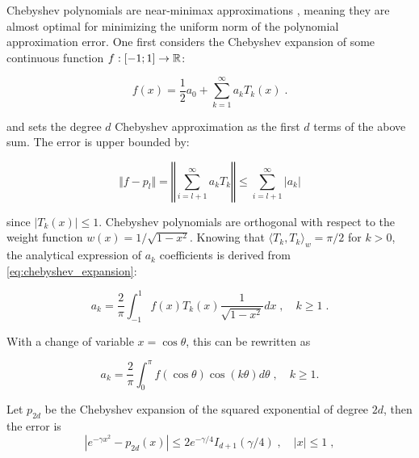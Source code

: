 \documentclass{article}
\begin{document}
{Chebyshev polynomials are near-minimax approximations \cite{elliott_error_1987}, meaning they are almost optimal for minimizing the uniform norm of the polynomial approximation error. 
One first considers the Chebyshev expansion of some continuous function $f: [-1; 1] \to \mathbb R$:


\begin{equation} \label{eq:chebyshev_expansion}
    f(x) = \frac 1 2 a_0 + \sum_{k=1}^\infty a_k T_k(x) \; .
\end{equation}

and sets the degree $d$ Chebyshev approximation as the first $d$ terms of the above sum. The error is upper bounded by:

\begin{equation*}
    \Vert f - p_l \Vert = \left\Vert \textstyle\sum_{i=l+1}^\infty a_k T_k \right\Vert \le \sum_{i=l+1}^\infty |a_k|
\end{equation*}

since $|T_k(x)| \le 1$. Chebyshev polynomials are orthogonal with respect to the weight function $w(x) = 1/\sqrt{1-x^2}$. Knowing that $\langle T_k, T_k\rangle _w = \pi/2$ for $k > 0$, the analytical expression of $a_k$ coefficients is derived from \eqref{eq:chebyshev_expansion}:

\begin{equation} \label{eq:chebyshev_coef}
    a_k = \frac{2}{\pi} \int_{-1}^1 f(x) T_k(x) \frac{1}{\sqrt{1-x^2}} dx \; , \quad k \ge 1 \; .
\end{equation}

With a change of variable $x = \cos \theta$, this can be rewritten as

\begin{equation} \label{eq:chebyshev_coef_cos}
    a_k = \frac{2}{\pi} \int_0^\pi f(\cos\theta) \cos(k\theta) d\theta \;, \quad k \ge 1 .
\end{equation}


\begin{lemma} \label{thm:se_decay_1d}
Let $p_{2d}$ be the Chebyshev expansion of the squared exponential of degree $2d$, then the error is
\begin{equation*}
    | e^{-\gamma x^2} - p_{2d}(x)| \le 2 e^{-\gamma / 4} I_{d+1}(\gamma / 4) \;, \quad |x| \le 1 \;, 
\end{equation*}


\end{lemma}}
\end{document}
